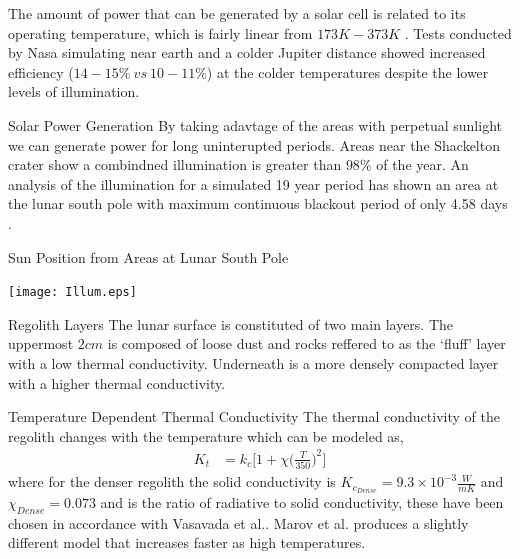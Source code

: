 \documentclass{beamer}
\begin{document}
\begin{frame}
The amount of power that can be generated by a solar cell is related to its operating temperature, which is fairly linear from $173 K - 373K$ \cite{Mcevoy}. Tests conducted by Nasa simulating near earth and a colder Jupiter distance showed increased efficiency ($14-15\%\ vs\ 10-11\%  $) at the colder temperatures despite the lower levels of illumination\cite{Liebert}.
\end{frame}

\begin{frame}{Solar Power Generation}
By taking adavtage of the areas with perpetual sunlight we can generate power for long uninterupted periods. Areas near the Shackelton crater show a combindned illumination is greater than $98 \% $ of the year\cite{Bussey}. An analysis of the illumination for a simulated 19 year period has shown an area at the lunar south pole with maximum continuous blackout period of only 4.58 days \cite{Mazarico}.  
\end{frame}

\begin{frame}{Sun Position from Areas at Lunar South Pole}


 \begin{center}
             \texttt{[image: Illum.eps]}   
      \end{center}  

\end{frame}

\begin{frame}{Regolith Layers}
The lunar surface is constituted of two main layers. The uppermost $2cm$ is composed of loose dust and rocks reffered to as the `fluff' layer with a low thermal conductivity. Underneath is a more densely compacted layer with a higher thermal conductivity\cite{Malla}.
\end{frame}


\begin{frame}{Temperature Dependent Thermal Conductivity}
The thermal conductivity of the regolith changes with the temperature which can be modeled as,
\begin{align*}
K_t & = k_c \Bigg [ 1+\chi \bigg ( \frac{T}{350} \bigg )^2  \bigg ]
\end{align*}
where for the denser regolith the solid conductivity is $K_{c_{Dense}} = 9.3\times 10^{-3} \frac{W}{mK}$ and $\chi_{Dense}= 0.073$ and is the ratio of radiative to solid conductivity, these have been chosen in accordance with Vasavada et al.\cite{Vasavada}. Marov et al. produces a slightly different model that increases faster as high temperatures.
\end{frame}
\end{document}
